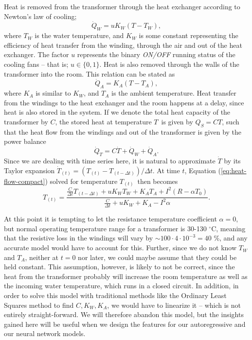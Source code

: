 \documentclass[]{article}
\begin{document}
Heat is removed from the transformer through the heat exchanger according to Newton's law of cooling;
\begin{equation}
	\dot{Q}_W = uK_W (T - T_W),
\end{equation}
where $T_W$ is the water temperature, and $K_W$ is some constant representing the efficiency of heat transfer from the winding, through the air and out of the heat exchanger. The factor $u$ represents the binary \textit{ON/OFF} running status of the cooling fans -- that is; $u \in \{0,1\}$. Heat is also removed through the walls of the transformer into the room. This relation can be stated as
\begin{equation}
	\dot{Q}_A = K_A (T - T_A),
\end{equation}
where $K_A$ is similar to $K_W$, and $T_A$ is the ambient temperature. Heat transfer from the windings to the heat exchanger and the room happens at a delay, since heat is also stored in the system. If we denote the total heat capacity of the transformer by $C$, the stored heat at temperature $T$ is given by $Q_S = CT$, such that the heat flow from the windings and out of the transformer is given by the power balance
\begin{equation} \label{eq:heat-flow-compact}
	\dot{Q}_T = C \dot{T} + \dot{Q}_W + \dot{Q}_A.
\end{equation}
Since we are dealing with time series here, it is natural to approximate $\dot{T}$ by its Taylor expansion $\dot{T}_{(t)} = (T_{(t)} - T_{(t-\Delta t)})/ \Delta t$. At time $t$, Equation (\ref{eq:heat-flow-compact}) solved for temperature $T_{(t)}$ then becomes
\begin{equation} \label{eq:heat-flow-expanded-t}
	T_{(t)} = \frac{\frac{C}{\Delta t} T_{(t-\Delta t)} + uK_W T_W + K_A T_A + I^2 (R - \alpha T_0)}{\frac{C}{\Delta t} + uK_W + K_A - I^2 \alpha}.
\end{equation}

At this point it is tempting to let the resistance temperature coefficient $\alpha = 0$, but normal operating temperature range for a transformer is 30-130 $^\circ$C, meaning that the resistive loss in the windings will vary by $\sim 100 \cdot 4 \cdot 10^{-3} = 40 $ \%, and any accurate model would have to account for this. Further, since we do not know $T_W$ and $T_A$, neither at $t = 0$ nor later, we could maybe assume that they could be held constant. This assumption, however, is likely to not be correct, since the heat from the transformer probably will increase the room temperature as well as the incoming water temperature, which runs in a closed circuit. In addition, in order to solve this model with traditional methods like the Ordinary Least Squares method to find $C, K_W, K_A$, we would have to linearize it -- which is not entirely straight-forward. We will therefore abandon this model, but the insights gained here will be useful when we design the features for our autoregressive and our neural network models.
\end{document}
